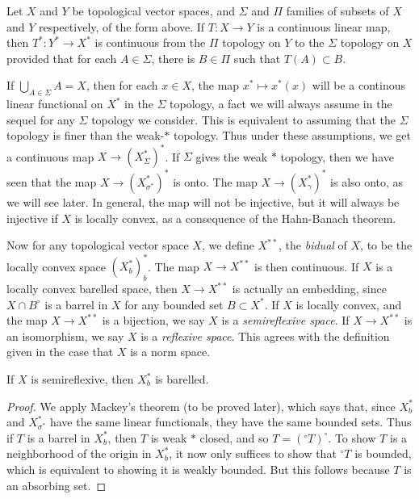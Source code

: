 \begin{theorem}
    Let $X$ and $Y$ be topological vector spaces, and $\Sigma$ and $\Pi$ families of subsets of $X$ and $Y$ respectively, of the form above. If $T: X \to Y$ is a continuous linear map, then $T^*: Y^* \to X^*$ is continuous from the $\Pi$ topology on $Y$ to the $\Sigma$ topology on $X$ provided that for each $A \in \Sigma$, there is $B \in \Pi$ such that $T(A) \subset B$.
\end{theorem}

If $\bigcup_{A \in \Sigma} A = X$, then for each $x \in X$, the map $x^* \mapsto x^*(x)$ will be a continous linear functional on $X^*$ in the $\Sigma$ topology, a fact we will always assume in the sequel for any $\Sigma$ topology we consider. This is equivalent to assuming that the $\Sigma$ topology is finer than the weak-$*$ topology. Thus under these assumptions, we get a continuous map $X \to (X^*_\Sigma)^*$. If $\Sigma$ gives the weak $*$ topology, then we have seen that the map $X \to (X^*_{\sigma^*})^*$ is onto. The map $X \to (X^*_\gamma)^*$ is also onto, as we will see later. In general, the map will not be injective, but it will always be injective if $X$ is locally convex, as a consequence of the Hahn-Banach theorem.

Now for any topological vector space $X$, we define $X^{**}$, the \emph{bidual} of $X$, to be the locally convex space $(X^*_b)^*_b$. The map $X \to X^{**}$ is then continuous. If $X$ is a locally convex barelled space, then $X \to X^{**}$ is actually an embedding, since $X \cap B^\circ$ is a barrel in $X$ for any bounded set $B \subset X^*$. If $X$ is locally convex, and the map $X \to X^{**}$ is a bijection, we say $X$ is a \emph{semireflexive space}. If $X \to X^{**}$ is an isomorphism, we say $X$ is a \emph{reflexive space}. This agrees with the definition given in the case that $X$ is a norm space.

\begin{theorem}
    If $X$ is semireflexive, then $X^*_b$ is barelled.
\end{theorem}
\begin{proof}
    We apply Mackey's theorem (to be proved later), which says that, since $X^*_b$ and $X^*_{\sigma^*}$ have the same linear functionals, they have the same bounded sets. Thus if $T$ is a barrel in $X^*_b$, then $T$ is weak $*$ closed, and so $T = ({}^\circ T)^\circ$. To show $T$ is a neighborhood of the origin in $X^*_b$, it now only suffices to show that ${}^\circ T$ is bounded, which is equivalent to showing it is weakly bounded. But this follows because $T$ is an absorbing set.
\end{proof}

